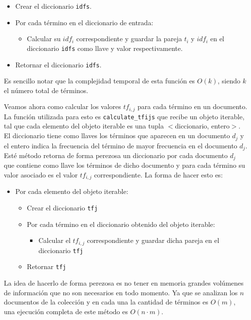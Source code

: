 \documentclass[runningheads]{llncs}
\begin{document}
	\begin{itemize}
		\item Crear el diccionario \verb|idfs|.
		\item Por cada t\'ermino en el diccionario de entrada:
		\begin{itemize}
			\item Calcular su $idf_i$ correspondiente y guardar la pareja $t_i$ y $idf_i$ en el diccionario \verb|idfs| como llave y valor respectivamente.
		\end{itemize}
		\item  Retornar el diccionario \verb|idfs|.
	\end{itemize}
	 
	 Es sencillo notar que la complejidad temporal de esta funci\'on es $O(k)$, siendo $k$ el n\'umero total de t\'erminos.
	
	Veamos ahora como calcular los valores $tf_{i,j}$ para cada t\'ermino en un documento. La funci\'on utilizada para esto es \verb|calculate_tfijs| que recibe un objeto iterable, tal que cada elemento del objeto iterable es una tupla $<$diccionario, entero$>$. El diccionario tiene como llaves los t\'erminos que aparecen en un documento $d_j$ y el entero indica la frecuencia del t\'ermino de mayor frecuencia en el documento $d_j$. Est\'e m\'etodo retorna de forma perezosa un diccionario por cada documento $d_j$ que contiene como llave los t\'erminos de dicho documento y para cada t\'ermino su valor asociado es el valor $tf_{i,j}$ correspondiente. La forma de hacer esto es:
	
	\begin{itemize}
		\item Por cada elemento del objeto iterable:
		\begin{itemize}
			\item Crear el diccionario \verb|tfj|
			\item Por cada t\'ermino en el diccionario obtenido del objeto iterable:
			\begin{itemize}
				\item Calcular el $tf_{i,j}$ correspondiente y guardar dicha pareja en el diccionario \verb|tfj|
			\end{itemize}
			\item Retornar \verb|tfj| 
		\end{itemize}
		 
	\end{itemize}
	
	La idea de hacerlo de forma perezosa es no tener en memoria grandes vol\'umenes de informaci\'on que no son necesarios en todo momento. Ya que se analizan los $n$ documentos de la colecci\'on y en cada una la cantidad de t\'erminos es $O(m)$, una ejecuci\'on completa de este m\'etodo es $O(n\cdot m)$.
	
\end{document}
